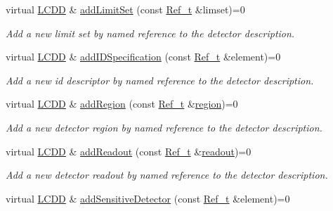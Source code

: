 \begin{DoxyCompactItemize}
virtual \hyperlink{class_d_d4hep_1_1_geometry_1_1_l_c_d_d}{L\+C\+DD} \& \hyperlink{class_d_d4hep_1_1_geometry_1_1_l_c_d_d_af11d7a6aaeb91256f14d5892d84e2b30}{add\+Limit\+Set} (const \hyperlink{group___d_d4_h_e_p___g_e_o_m_e_t_r_y_ga40af83be6718bb8828a3d83dc7f8c930}{Ref\+\_\+t} \&limset)=0
\begin{DoxyCompactList}\small\item\em Add a new limit set by named reference to the detector description. \end{DoxyCompactList}\item 
virtual \hyperlink{class_d_d4hep_1_1_geometry_1_1_l_c_d_d}{L\+C\+DD} \& \hyperlink{class_d_d4hep_1_1_geometry_1_1_l_c_d_d_a93f80b4976e72a8a64d73baa6cf50a4d}{add\+I\+D\+Specification} (const \hyperlink{group___d_d4_h_e_p___g_e_o_m_e_t_r_y_ga40af83be6718bb8828a3d83dc7f8c930}{Ref\+\_\+t} \&element)=0
\begin{DoxyCompactList}\small\item\em Add a new id descriptor by named reference to the detector description. \end{DoxyCompactList}\item 
virtual \hyperlink{class_d_d4hep_1_1_geometry_1_1_l_c_d_d}{L\+C\+DD} \& \hyperlink{class_d_d4hep_1_1_geometry_1_1_l_c_d_d_a633c913dcf2a31b52976e5f5bd8a63e2}{add\+Region} (const \hyperlink{group___d_d4_h_e_p___g_e_o_m_e_t_r_y_ga40af83be6718bb8828a3d83dc7f8c930}{Ref\+\_\+t} \&\hyperlink{class_d_d4hep_1_1_geometry_1_1_l_c_d_d_adbe06759881707fe995472c03810c0ff}{region})=0
\begin{DoxyCompactList}\small\item\em Add a new detector region by named reference to the detector description. \end{DoxyCompactList}\item 
virtual \hyperlink{class_d_d4hep_1_1_geometry_1_1_l_c_d_d}{L\+C\+DD} \& \hyperlink{class_d_d4hep_1_1_geometry_1_1_l_c_d_d_a9823ad063bd9986e92e66c29f13e28f7}{add\+Readout} (const \hyperlink{group___d_d4_h_e_p___g_e_o_m_e_t_r_y_ga40af83be6718bb8828a3d83dc7f8c930}{Ref\+\_\+t} \&\hyperlink{class_d_d4hep_1_1_geometry_1_1_l_c_d_d_aa29f75fba9942edd7f73226a11c9598e}{readout})=0
\begin{DoxyCompactList}\small\item\em Add a new detector readout by named reference to the detector description. \end{DoxyCompactList}\item 
virtual \hyperlink{class_d_d4hep_1_1_geometry_1_1_l_c_d_d}{L\+C\+DD} \& \hyperlink{class_d_d4hep_1_1_geometry_1_1_l_c_d_d_aa574186ef096f626835ea6f389769230}{add\+Sensitive\+Detector} (const \hyperlink{group___d_d4_h_e_p___g_e_o_m_e_t_r_y_ga40af83be6718bb8828a3d83dc7f8c930}{Ref\+\_\+t} \&element)=0

\end{DoxyCompactItemize}
